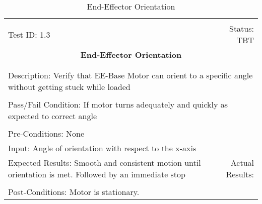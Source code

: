 \documentclass[titlepage]{article}
\begin{document}
\begin{center}%
\begin{table}[h!]
\begin{tabular}{|l r|}\hline&\\[-2mm]
	Test ID: 1.3	&Status: TBT\\[-3mm]
	\multicolumn{2}{|c|}{\textbf{\large{End-Effector Orientation}}}\\&\\\hline&\\[-3mm]
	\multicolumn{2}{|p{\textwidth}|}{Description: Verify that EE-Base Motor can orient to a specific angle without getting stuck while loaded}\\[1mm]\hline&\\[-3mm]
	\multicolumn{2}{|p{\textwidth}|}{Pass/Fail Condition: If motor turns adequately and quickly as expected to correct angle}\\[1mm]\hline&\\[-3mm]
	\multicolumn{2}{|p{\textwidth}|}{Pre-Conditions: None}\\[4mm]
	\multicolumn{2}{|p{\textwidth}|}{Input: Angle of orientation with respect to the x-axis}\\[2mm]\hline
	\multicolumn{1}{|p{0.49\textwidth}}{Expected Results: Smooth and consistent motion until orientation is met. Followed by an immediate stop}	&\multicolumn{1}{|p{0.45\textwidth}|}{Actual Results:}\\\hline&\\[-3mm]
	\multicolumn{2}{|p{\textwidth}|}{Post-Conditions: Motor is stationary.}\\\hline
\end{tabular}
\caption{End-Effector Orientation}
\end{table}
\end{center}
\newpage
\end{document}
